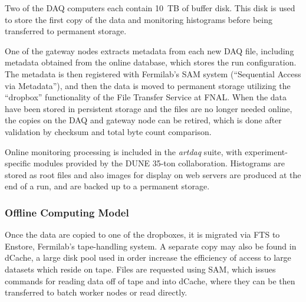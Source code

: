 
Two of the DAQ computers each contain 10~TB of buffer disk.  This disk is used to store the first copy of
the data and monitoring histograms before being transferred to permanent storage.


One of the gateway nodes extracts metadata from each new DAQ file, including metadata obtained from the online
database, which stores the run configuration.  The metadata is then registered with Fermilab's  SAM system
(``Sequential Access via Metadata''), and then the data is moved to permanent storage utilizing the ``dropbox'' functionality of the File Transfer Service at FNAL.
When the data have been stored in persistent storage and the files are no longer needed online,
the copies on the DAQ and gateway node can be retired, which is done after validation by checksum and
total byte count comparison.

Online monitoring processing is included in the {\it artdaq} suite, with experiment-specific modules
provided by the DUNE 35-ton collaboration.  Histograms are stored as root files and also
images for display on web servers are produced at the end of a run, and are backed up to a permanent storage.


\subsubsection{Offline Computing Model}

Once the data are copied to one of the dropboxes, it is migrated via FTS to Enstore, Fermilab's tape-handling
system.  A separate copy may also be found in dCache, a large disk pool used in order increase the
efficiency of access to large datasets which reside on tape.  Files are requested using SAM, which
issues commands for reading data off of tape and into dCache, where they can be then transferred
to batch worker nodes or read directly.  

